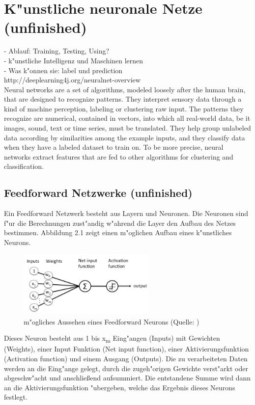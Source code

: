 \chapter{K"unstliche neuronale Netze (unfinished)}
{
- Ablauf: Training, Testing, Using?\\
- k"unstliche Intelligenz und Maschinen lernen\\
- Was k"onnen sie: label und prediction\\
http://deeplearning4j.org/neuralnet-overview\\
Neural networks are a set of algorithms, modeled loosely after the human brain, that are designed to recognize patterns. They interpret sensory data through a kind of machine perception, labeling or clustering raw input. The patterns they recognize are numerical, contained in vectors, into which all real-world data, be it images, sound, text or time series, must be translated.
They help group unlabeled data according by similarities among the example inputs, and they classify data when they have a labeled dataset to train on. To be more precise, neural networks extract features that are fed to other algorithms for clustering and classification.

\section{Feedforward Netzwerke (unfinished)}
Ein Feedforward Netzwerk besteht aus Layern und Neuronen. Die Neuronen sind f"ur die Berechnungen zust"andig w"ahrend die Layer den Aufbau des Netzes bestimmen. Abbildung 2.1 zeigt einen m"oglichen Aufbau eines k"unstliches Neurons.
\renewcommand{\figurename}{Abb.}
\begin{figure}[htp]
\centering
\includegraphics[width=0.60\textwidth]{pictures/perceptron_node.png}
\caption[Feedforward Neuron]{m"ogliches Aussehen eines Feedforward Neurons (Quelle: \cite{FNeuron})}
\end{figure}
Dieses Neuron besteht aus 1 bis x\textsubscript{m} Eing"angen (Inputs) mit Gewichten (Weights), einer Input Funktion (Net input function), einer Aktivierungsfunktion (Activation function) und einem Ausgang (Outputs). Die zu verarbeiteten Daten werden an die Eing"ange gelegt, durch die zugeh"origen Gewichte verst"arkt oder abgeschw"acht und anschlie{\ss}end aufsummiert. Die entstandene Summe wird dann an die Aktivierungsfunktion "ubergeben, welche das Ergebnis dieses Neurons festlegt.

}
